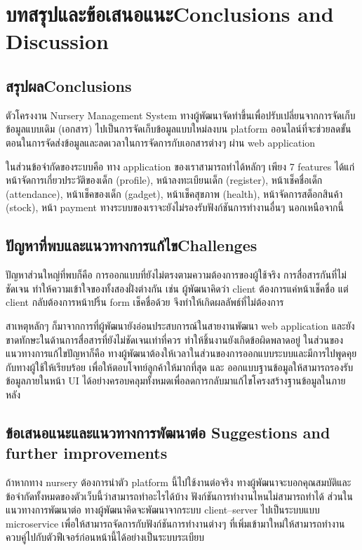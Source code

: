 \chapter{\ifcpe บทสรุปและข้อเสนอแนะ\else Conclusions and Discussion\fi}

\section{\ifcpe สรุปผล\else Conclusions\fi}

ตัวโครงงาน  Nursery Management System  ทางผู้พัฒนาจัดทำขึ้นเพื่อปรับเปลี่ยนจากการจัดเก็บข้อมูลแบบเดิม (เอกสาร) ไปเป็นการจัดเก็บข้อมูลแบบใหม่ลงบน platform ออนไลน์ที่จะช่วยลดขั้นตอนในการจัดส่งข้อมูลและลดเวลาในการจัดการกับเอกสารต่างๆ ผ่าน web application 

ในส่วนข้อจำกัดของระบบคือ ทาง application ของเราสามารถทำได้หลักๆ เพียง 7 features ได้แก่ หน้าจัดการเกี่ยวประวัติของเด็ก (profile), หน้าลงทะเบียนเด็ก (register), หน้าเช็คชื่อเด็ก (attendance), หน้าเช็คของเด็ก (gadget), หน้าเช็คสุขภาพ (health), หน้าจัดการสต็อกสินค้า (stock), หน้า payment ทางระบบของเราจะยังไม่รองรับฟังก์ชันการทำงานอื่นๆ นอกเหนือจากนี้

\section{\ifcpe ปัญหาที่พบและแนวทางการแก้ไข\else Challenges\fi}

ปัญหาส่วนใหญ่ที่พบก็คือ การออกแบบที่ยังไม่ตรงตามความต้องการของผู้ใช้จริง  การสื่อสารกันที่ไม่ชัดเจน ทำให้ความเข้าใจของทั้งสองฝั่งต่างกัน เช่น ผู้พัฒนาคิดว่า client ต้องการแค่หน้าเช็คชื่อ
แต่ client กลับต้องการหน้าปริ้น form เช็คชื่อด้วย จึงทำให้เกิดผลลัพธ์ที่ไม่ต้องการ  

สาเหตุหลักๆ ก็มาจากการที่ผู้พัฒนายังอ่อนประสบการณ์ในสายงานพัฒนา web application และยังขาดทักษะในด้านการสื่อสารที่ยังไม่ชัดเจนเท่าที่ควร ทำให้ชิ้นงานยังเกิดข้อผิดพลาดอยู่
ในส่วนของแนวทางการแก้ไขปัญหาก็คือ ทางผู้พัฒนาต้องให้เวลาในส่วนของการออกแบบระบบและมีการไปพูดคุยกับทางผู้ใช้ให้เรียบร้อย เพื่อให้ตอบโจทย์ลูกค้าให้มากที่สุด และ ออกแบบฐานข้อมูลให้สามารถรองรับข้อมูลภายในหน้า UI ได้อย่างครอบคลุมทั้งหมดเพื่อลดการกลับมาแก้ไขโครงสร้างฐานข้อมูลในภายหลัง
\section{\ifcpe%
ข้อเสนอแนะและแนวทางการพัฒนาต่อ
\else%
Suggestions and further improvements
\fi
}

ถ้าหากทาง nursery ต้องการนำตัว platform นี้ไปใช้งานต่อจริง ทางผู้พัฒนาจะบอกคุณสมบัติและข้อจำกัดทั้งหมดของตัวเว็บนี้ว่าสามารถทำอะไรได้บ้าง ฟังก์ชันการทำงานไหนไม่สามารถทำได้
ส่วนในแนวทางการพัฒนาต่อ  ทางผู้พัฒนาคิดจะพัฒนาจากระบบ client--server ไปเป็นระบบแบบ microservice เพื่อให้สามารถจัดการกับฟังก์ชันการทำงานต่างๆ ที่เพิ่มเข้ามาใหม่ให้สามารถทำงานควบคู่ไปกับตัวฟีเจอร์ก่อนหน้านี้ได้อย่างเป็นระบบระเบียบ

